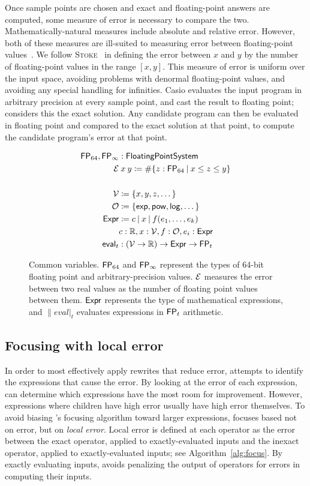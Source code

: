 \documentclass[paper.tex]{subfiles}
\begin{document}
  Once sample points are chosen and exact and floating-point answers
  are computed, some measure of error is necessary to compare the two.
  Mathematically-natural measures include absolute and relative error.
  However, both of these measures are ill-suited to measuring error
  between floating-point values~\cite{}.  We follow
  \textsc{Stoke}~\cite{} in defining the error between $x$ and $y$ by
  the number of floating-point values in the range $[x, y]$.  This
  measure of error is uniform over the input space, avoiding problems
  with denormal floating-point values, and avoiding any special
  handling for infinities.  Casio evaluates the input program in
  arbitrary precision at every sample point, and cast the result to
  floating point; \casio considers this the exact solution.  Any
  candidate program can then be evaluated in floating point and
  compared to the exact solution at that point, to compute the
  candidate program's error at that point.

\begin{figure}
\begin{align*}
  \FP_{64}, \FP_\infty &: \|FloatingPointSystem| \\
  \Err &\:x\:y \ceq \#\{ z : \FP_{64}\:|\:x \le z \le y \} \\
  \\
  \Var &\ceq \{ x, y, z, \dotsc \} \\
  \Op &\ceq \{ \|exp|, \|pow|, \|log|, \dotsc \} \\
  \Expr &\ceq c \I x \I f(e_1, \dotsc, e_k) \\
  & c : \RR, x : \Var, f : \Op, e_i : \Expr \\
  \|eval|_t &: (\Var \to \RR) \to \Expr \to \FP_t
\end{align*}
\caption{Common variables. $\mathsf{FP}_{64}$ and $\mathsf{FP}_\infty$ represent
  the types of 64-bit floating point and arbitrary-precision values.
  $\mathcal{E}$ measures the error between two real values
  as the number of floating point values between them.
  $\mathsf{Expr}$ represents the type of mathematical expressions,
  and $\|eval|_t$ evaluates expressions in $\mathsf{FP}_t$ arithmetic.}
\label{alg:defs}
\end{figure}

\subsection{Focusing with local error}

In order to most effectively apply rewrites that reduce error,
  \casio attempts to identify the expressions that cause the error.
By looking at the error of each expression,
  \casio can determine which expressions
  have the most room for improvement.
However, expressions where children have high error
  usually have high error themselves.
To avoid biasing \casio's focusing algorithm
  toward larger expressions, \casio focuses
  based not on error, but on \emph{local error}.
Local error is defined at each operator
  as the error between
  the exact operator, applied to exactly-evaluated inputs
  and the inexact operator, applied to exactly-evaluated inputs;
  see Algorithm~\ref{alg:focus}.
By exactly evaluating inputs,
  \casio avoids penalizing the output of operators
  for errors in computing their inputs.
\end{document}
